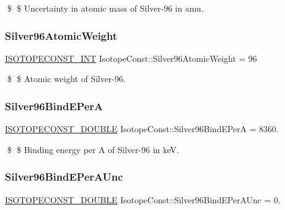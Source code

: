 \$ \$ Uncertainty in atomic mass of Silver-\/96 in amu. \mbox{\label{group___isotope_const-_silver-_ag96_ga0a44a4ef10567ec5cbb04d494cbe22b2}} 
\subsubsection{\texorpdfstring{Silver96\+Atomic\+Weight}{Silver96AtomicWeight}}
{\footnotesize\ttfamily \mbox{\hyperlink{group___isotope_const-_macros_ga5f18360b3e99483a35c32d789e62621c}{I\+S\+O\+T\+O\+P\+E\+C\+O\+N\+S\+T\+\_\+\+I\+NT}} Isotope\+Const\+::\+Silver96\+Atomic\+Weight = 96}

\$ \$ Atomic weight of Silver-\/96. \mbox{\label{group___isotope_const-_silver-_ag96_ga4c353378e9a7b3beff2ae206450456d0}} 
\subsubsection{\texorpdfstring{Silver96\+Bind\+E\+PerA}{Silver96BindEPerA}}
{\footnotesize\ttfamily \mbox{\hyperlink{group___isotope_const-_macros_ga8f45a7272ce02c0b4c65c44636ed719a}{I\+S\+O\+T\+O\+P\+E\+C\+O\+N\+S\+T\+\_\+\+D\+O\+U\+B\+LE}} Isotope\+Const\+::\+Silver96\+Bind\+E\+PerA = 8360.}

\$ \$ Binding energy per A of Silver-\/96 in keV. \mbox{\label{group___isotope_const-_silver-_ag96_gac33e105c2851d6273a0f838f106b654a}} 
\subsubsection{\texorpdfstring{Silver96\+Bind\+E\+Per\+A\+Unc}{Silver96BindEPerAUnc}}
{\footnotesize\ttfamily \mbox{\hyperlink{group___isotope_const-_macros_ga8f45a7272ce02c0b4c65c44636ed719a}{I\+S\+O\+T\+O\+P\+E\+C\+O\+N\+S\+T\+\_\+\+D\+O\+U\+B\+LE}} Isotope\+Const\+::\+Silver96\+Bind\+E\+Per\+A\+Unc = 0.}

